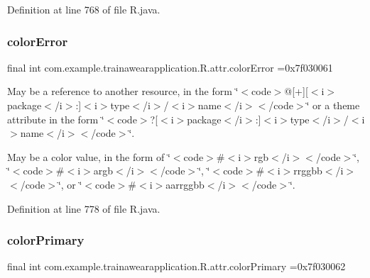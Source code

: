 Definition at line 768 of file R.\+java.

\mbox{\label{classcom_1_1example_1_1trainawearapplication_1_1_r_1_1attr_a3ffb6df2ae2792737e5462515f5e38c3}} 
\subsubsection{\texorpdfstring{colorError}{colorError}}
{\footnotesize\ttfamily final int com.\+example.\+trainawearapplication.\+R.\+attr.\+color\+Error =0x7f030061\hspace{0.3cm}{\ttfamily [static]}}

May be a reference to another resource, in the form \char`\"{}$<$code$>$@\mbox{[}+\mbox{]}\mbox{[}$<$i$>$package$<$/i$>$\+:\mbox{]}$<$i$>$type$<$/i$>$/$<$i$>$name$<$/i$>$$<$/code$>$\char`\"{} or a theme attribute in the form \char`\"{}$<$code$>$?\mbox{[}$<$i$>$package$<$/i$>$\+:\mbox{]}$<$i$>$type$<$/i$>$/$<$i$>$name$<$/i$>$$<$/code$>$\char`\"{}. 

May be a color value, in the form of \char`\"{}$<$code$>$\#$<$i$>$rgb$<$/i$>$$<$/code$>$\char`\"{}, \char`\"{}$<$code$>$\#$<$i$>$argb$<$/i$>$$<$/code$>$\char`\"{}, \char`\"{}$<$code$>$\#$<$i$>$rrggbb$<$/i$>$$<$/code$>$\char`\"{}, or \char`\"{}$<$code$>$\#$<$i$>$aarrggbb$<$/i$>$$<$/code$>$\char`\"{}. 

Definition at line 778 of file R.\+java.

\mbox{\label{classcom_1_1example_1_1trainawearapplication_1_1_r_1_1attr_aceb4510a798e191d62a6591ff5da036c}} 
\subsubsection{\texorpdfstring{colorPrimary}{colorPrimary}}
{\footnotesize\ttfamily final int com.\+example.\+trainawearapplication.\+R.\+attr.\+color\+Primary =0x7f030062\hspace{0.3cm}{\ttfamily [static]}}

